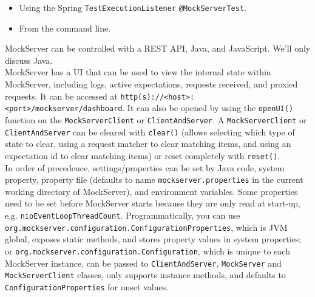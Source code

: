 \documentclass[table, xcdraw]{article}%
\begin{document}
\begin{itemize}
    \begin{verbatim}
@ExtendWith(MockServerExtension.class)
@MockServerSettings(ports = {8787, 8888}) // Configure ports
class ClientTests {
    private final ClientAndServer client;

    // Injection done by the extension
    public ExampleTestClass(ClientAndServer client) {
        this.client = client;
    }
    // OR
    @BeforeEach
    public void beforeEachLifecyleMethod(MockServerClient client) {
        this.client = client;
    }

    @Test
    void testSomething() { // You can also inject here
        // ...
    }
}
    \end{verbatim}
    \item Using the Spring \texttt{TestExecutionListener} \texttt{@MockServerTest}.
    \item From the command line.
\end{itemize}

MockServer can be controlled with a REST API, Java, and JavaScript. We'll only discuss Java.\\
MockServer has a UI that can be used to view the internal state within MockServer, including logs, active expectations, requests received, and proxied requests. It can be accessed at \texttt{http(s)://<host>:<port>/mockserver/dashboard}. It can also be opened by using the \texttt{openUI()} function on the \texttt{MockServerClient} or \texttt{ClientAndServer}. A \texttt{MockServerClient} or \texttt{ClientAndServer} can be cleared with \texttt{clear()} (allows selecting which type of state to clear, using a request matcher to clear matching items, and using an expectation id to clear matching items) or reset completely with \texttt{reset()}.\\
In order of precedence, settings/properties can be set by Java code, system property, property file (defaults to name \texttt{mockserver.properties} in the current working directory of MockServer), and environment variables. Some properties need to be set before MockServer starts because they are only read at start-up, e.g. \texttt{nioEventLoopThreadCount}. Programmatically, you can use \texttt{org.mockserver.configuration.ConfigurationProperties}, which is JVM global, exposes static methods, and stores property values in system properties; or \texttt{org.mockserver.configuration.Configuration}, which is unique to each MockServer instance, can be passed to \texttt{ClientAndServer}, \texttt{MockServer} and \texttt{MockServerClient} classes, only supports instance methods, and defaults to \texttt{ConfigurationProperties} for unset values.
\end{document}
